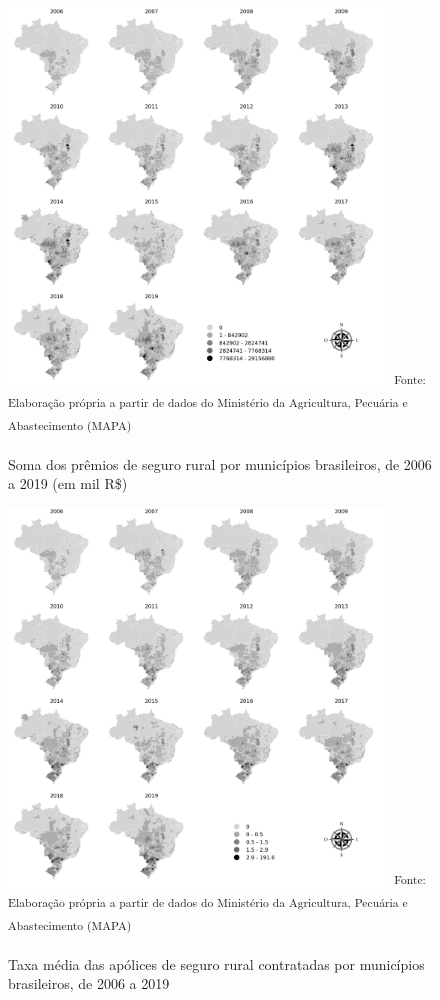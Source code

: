 \begin{figure}[H]
	\centering
	\caption{Soma dos prêmios de seguro rural por municípios brasileiros, de 2006 a 2019 (em mil R\$)}
	\includegraphics[width=0.9\textwidth]{figuras/map_soma_premio_total_mil.png}
	\small \textsuperscript {Fonte: Elaboração própria a partir de dados do Ministério da Agricultura, Pecuária e Abastecimento (MAPA)}
    \label{map_lisa_soma_premio}
\end{figure}

\begin{figure}[H]
	\centering
	\caption{Taxa média das apólices de seguro rural contratadas por municípios brasileiros, de 2006 a 2019}
	\includegraphics[width=0.9\textwidth]{figuras/map_taxa_media.png}
	\small \textsuperscript {Fonte: Elaboração própria a partir de dados do Ministério da Agricultura, Pecuária e Abastecimento (MAPA)}
    \label{map_lisa_taxa_media}
\end{figure}

